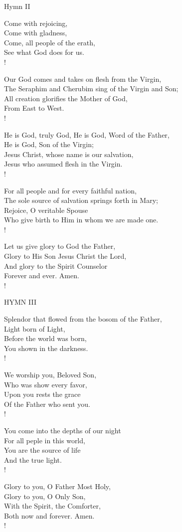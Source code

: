 Hymn II
\begin{cverse}
Come with rejoicing,\\
Come with gladness,\\
Come, all people of the erath,\\
See what God does for us.\\!

Our God comes and takes on flesh from the Virgin,\\
The Seraphim and Cherubim sing of the Virgin and Son;\\
All creation glorifies the Mother of God,\\
From East to West.\\!

He is God, truly  God, He is God, Word of the Father,\\
He is God, Son of the Virgin;\\
Jesus Christ, whose name is our salvation,\\
Jesus who assumed flesh in the Virgin.\\!

For all people and for every faithful nation,\\
The sole source of salvation springs forth in Mary;\\
Rejoice, O veritable Spouse\\
Who give birth to Him in whom we are made one.\\!

Let us give glory to God the Father,\\
Glory to His Son Jesus Christ the Lord,\\
And glory to the Spirit Counselor\\
Forever and ever. Amen.\\!
\end{cverse}

\noindent\small{\uppercase{Hymn III }}\normalsize\label{christmas:lastHymn}
\begin{cverse}
Splendor that flowed from the bosom of the Father,\\
Light born of Light,\\
Before the world was born,\\
You shown in the darkness.\\!

We worship you, Beloved Son,\\
Who was show every favor,\\
Upon you rests the grace\\
Of the Father who sent you.\\!

You come into the depths of our night\\
For all peple in this world,\\
You are the source of life\\
And the true light.\\!

Glory to you, O Father Most Holy,\\
Glory to you, O Only Son,\\
With the Spirit, the Comforter,\\
Both now and forever. Amen.\\!
\end{cverse}

